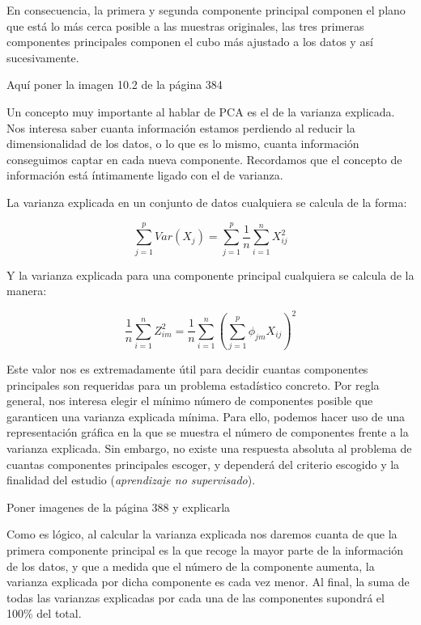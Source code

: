 \documentclass[12pt,a4paper,Spanish]{book}
\begin{document}
En consecuencia, la primera y segunda componente principal componen el plano que está lo más cerca posible a las muestras originales, las tres primeras componentes principales componen el cubo más ajustado a los datos y así sucesivamente.

Aquí poner la imagen 10.2 de la página 384


Un concepto muy importante al hablar de PCA es el de la varianza explicada. Nos interesa saber cuanta información estamos perdiendo al reducir la dimensionalidad de los datos, o lo que es lo mismo, cuanta información conseguimos captar en cada nueva componente. Recordamos que el concepto de información está íntimamente ligado con el de varianza.

La varianza explicada en un conjunto de datos cualquiera se calcula de la forma:

\begin{equation}
\sum_{j=1}^{p}Var(X_j) = \sum_{j=1}^{p}\dfrac{1}{n}\sum_{i=1}^{n}X_{ij}^2
\end{equation}

Y la varianza explicada para una componente principal cualquiera se calcula de la manera:

\begin{equation}
\dfrac{1}{n}\sum_{i=1}^{n}Z_{im}^2 = \dfrac{1}{n}\sum_{i=1}^{n}\left(\sum_{j=1}^{p}\phi_{jm}X_{ij}\right)^2
\end{equation}

Este valor nos es extremadamente útil para decidir cuantas componentes principales son requeridas para un problema estadístico concreto. Por regla general, nos interesa elegir el mínimo número de componentes posible que garanticen una varianza explicada mínima. Para ello, podemos hacer uso de una representación gráfica en la que se muestra el número de componentes frente a la varianza explicada. Sin embargo, no existe una respuesta absoluta al problema de cuantas componentes principales escoger, y dependerá del criterio escogido y la finalidad del estudio (\textit{aprendizaje no supervisado}).

Poner imagenes de la página 388 y explicarla

Como es lógico, al calcular la varianza explicada nos daremos cuanta de que la primera componente principal es la que recoge la mayor parte de la información de los datos, y que a medida que el número de la componente aumenta, la varianza explicada por dicha componente es cada vez menor. Al final, la suma de todas las varianzas explicadas por cada una de las componentes supondrá el 100\% del total.
\end{document}
